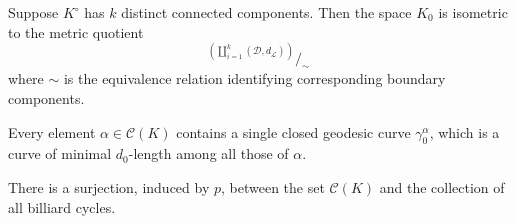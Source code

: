 \documentclass[10pt,a4paper]{amsart}
\begin{document}
\begin{theorem}\label{thm:K_0_as_gluing_metric_space}
    Suppose \( K^\circ \) has \( k \) distinct connected components. Then the space \( K_0 \) is isometric to the metric quotient 
    \[
        ^{\textstyle \left(\displaystyle{\coprod_{i=1}^k}(\mathcal{D}, d_\mathcal{L})\right)}\!\!\!\Big/_{\!\!\textstyle\sim \ }
    \]
    where \( \sim \) is the equivalence relation identifying corresponding boundary components.
\end{theorem}

\begin{lemma}\label{lem:unique_minimising_geodesic}
    Every element \( \alpha \in \mathcal{C}(K) \) contains a single closed geodesic curve \( \gamma^\alpha_0 \), which is a curve of minimal \(d_0\)-length among all those of \( \alpha \).
\end{lemma}

\begin{theorem}\label{thm:char_billiard_cycles_1}
    There is a surjection, induced by \( p \), between the set \( \mathcal{C}(K) \) and the collection of all billiard cycles.
\end{theorem}
\end{document}
